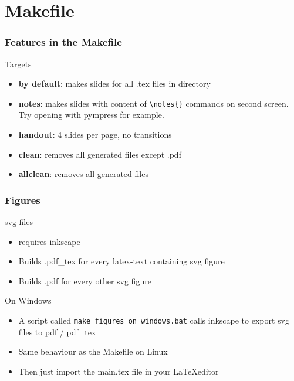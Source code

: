 \documentclass[aspectratio=169,c,12pt]{beamer}
\begin{document}
\section{Makefile}

\begin{frame}[fragile]
	\frametitle[Makefile ft.]{Features in the Makefile}
	\begin{block}{Targets}
		\begin{itemize}
			\item{\textbf{by default}:} makes slides for all .tex files in directory
			\item{\textbf{notes}:} makes slides with content of \verb|\notes{}| commands on second screen.\\ Try opening with pympress for example.
			\item{\textbf{handout}:} 4 slides per page, no transitions
			\item{\textbf{clean}:} removes all generated files except .pdf
			\item{\textbf{allclean}:} removes all generated files
		\end{itemize}
	\end{block}
\end{frame}

\begin{frame}
	\frametitle{Figures}
	\begin{block}{svg files}
		\begin{itemize}
			\item requires inkscape
			\item Builds .pdf\_tex for every latex-text containing svg figure
			\item Builds .pdf for every other svg figure
		\end{itemize}
	\end{block}

	\begin{block}{On Windows}
		\begin{itemize}
			\item A script called \texttt{make\_figures\_on\_windows.bat} calls inkscape to export svg files to pdf / pdf\_tex
			\item Same behaviour as the Makefile on Linux
			\item Then just import the main.tex file in your \LaTeX editor
		\end{itemize}
	\end{block}
\end{frame}
\end{document}
